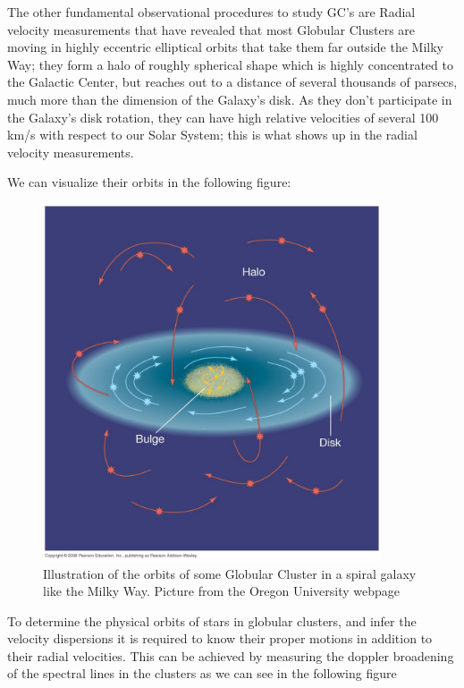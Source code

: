 The other fundamental observational procedures to study GC's are Radial velocity measurements that have revealed that most Globular Clusters are moving in highly eccentric elliptical orbits that take them far outside the Milky Way; they form a halo of roughly spherical shape which is highly concentrated to the Galactic Center, but reaches out to a distance of several thousands of parsecs, much more than the dimension of the Galaxy's disk. As they don't participate in the Galaxy's disk rotation, they can have high relative velocities of several 100 km/s with respect to our Solar System; this is what shows up in the radial velocity measurements. 

We can visualize their orbits in the following figure:

\begin{figure}[H]
\centering
\includegraphics[width=10cm]{images/orbits_gcs.jpg}
\caption[Illustration of the orbits of Globular Clusters around a spiral galaxy]{Illustration of the orbits of some Globular Cluster in a spiral galaxy like the Milky Way. Picture from the Oregon University webpage}
\end{figure}

To determine the physical orbits of stars in globular clusters, and infer the velocity dispersions it is required to know their proper motions in addition to their radial velocities. This can be achieved by measuring the doppler broadening of the spectral lines in the clusters as we can see in the following figure

